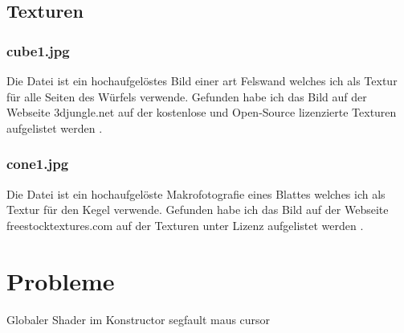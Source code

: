 \documentclass{article}
\begin{document}
\subsection{Texturen}
\subsubsection{cube1.jpg}
Die Datei  ist ein hochaufgelöstes Bild einer art Felswand welches ich als Textur für alle Seiten
des Würfels verwende. Gefunden habe ich das Bild auf der Webseite 3djungle.net auf der kostenlose und Open-Source
lizenzierte Texturen aufgelistet werden \cite{cube1}.
\subsubsection{cone1.jpg}
Die Datei  ist ein hochaufgelöste Makrofotografie eines Blattes welches ich als Textur für den
Kegel verwende. Gefunden habe ich das Bild auf der Webseite freestocktextures.com auf der
Texturen unter  Lizenz aufgelistet werden \cite{cone1}.
\section{Probleme}
Globaler Shader im Konstructor segfault 
maus cursor
\newpage
\printbibliography
\end{document}
